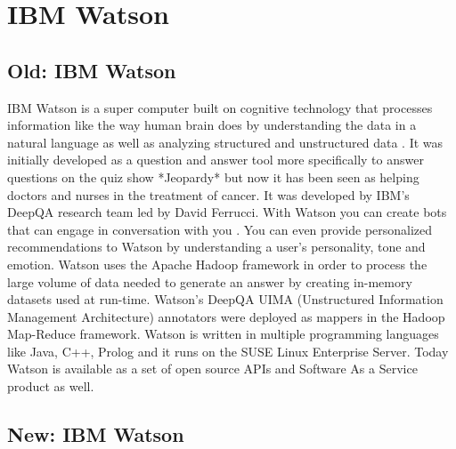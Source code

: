\section{IBM Watson}

\subsection{Old: IBM Watson}

IBM Watson is a super computer built on
cognitive technology that processes information like the way human
brain does by understanding the data in a natural language as well
as analyzing structured and unstructured data \cite{www-ibmwatson-wiki}.
It was initially
developed as a question and answer tool more specifically to
answer questions on the quiz show *Jeopardy* but now it has been
seen as helping doctors and nurses in the treatment of cancer. It
was developed by IBM's DeepQA research team led by David
Ferrucci. With Watson you can create bots that can engage
in conversation with you \cite{www-ibmwatson}. You can
even provide personalized recommendations to Watson by
understanding a user's personality, tone and emotion. Watson uses
the Apache Hadoop framework in order to process the large volume
of data needed to generate an answer by creating in-memory
datasets used at run-time. Watson's DeepQA UIMA (Unstructured
Information Management Architecture) annotators were deployed as
mappers in the Hadoop Map-Reduce framework. Watson is written in
multiple programming languages like Java, C++, Prolog and it runs
on the SUSE Linux Enterprise Server. Today Watson is available as
a set of open source
APIs and Software As a Service product as well\cite{www-ibmwatson}.


\subsection{New: IBM Watson}


